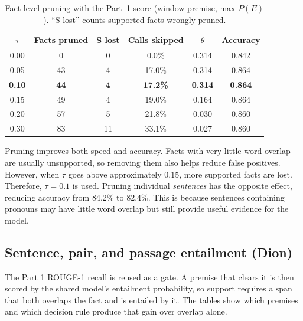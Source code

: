 \documentclass[12pt,a4paper]{article}
\begin{document}
\begin{table}[H]
\centering
\begin{tabular}{cccccc}
\toprule
$\tau$ & Facts pruned & S lost & Calls skipped & $\theta$ & Accuracy \\
\midrule
0.00 & 0  & 0  & 0.0\%  & 0.314 & 0.842 \\
0.05 & 43 & 4  & 17.0\% & 0.314 & 0.864 \\
\textbf{0.10} & \textbf{44} & \textbf{4} & \textbf{17.2\%} & \textbf{0.314} & \textbf{0.864} \\
0.15 & 49 & 4  & 19.0\% & 0.164 & 0.864 \\
0.20 & 57 & 5  & 21.8\% & 0.030 & 0.860 \\
0.30 & 83 & 11 & 33.1\% & 0.027 & 0.860 \\
\bottomrule
\end{tabular}
\caption{Fact-level pruning with the Part~1 score (window premise, max $P(E)$). ``S lost'' counts supported facts wrongly pruned.}
\label{tab:pruning}
\end{table}


\noindent Pruning improves both speed and accuracy. Facts with very little word overlap are usually unsupported, so removing them also helps reduce false positives. However, when $\tau$ goes above approximately $0.15$, more supported facts are lost. Therefore, $\tau = 0.1$ is used. Pruning individual \emph{sentences} has the opposite effect, reducing accuracy from 84.2\% to 82.4\%. This is because sentences containing pronouns may have little word overlap but still provide useful evidence for the model.

\subsection{Sentence, pair, and passage entailment (Dion)}
\label{sec:p2dion}

The Part 1 ROUGE-1 recall is reused as a gate. A premise that clears it is then scored by the shared model's entailment probability, so support requires a span that both overlaps the fact and is entailed by it. The tables show which premises and which decision rule produce that gain over overlap alone.
\end{document}
